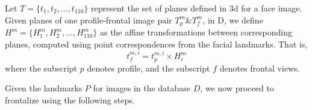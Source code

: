 Let $T = \{t_{1}, t_{2}, \ldots , t_{110}\}$
represent the set of planes defined in {\sc 3d} for a face image. Given planes of one
profile-frontal image pair $T_p^m \& T_f^m$, in D, we define $H^{m} = \{H_1^m, H_2^m, \ldots ,
H_{110}^m\}$ as the affine transformations between corresponding planes, computed using point correspondences from the facial landmarks. That is, 
\begin{equation}
  t_{f}^{m,i} = t_{p}^{m,i} \times H_i^m \label{eq:affine_transfomraiton}
\end{equation} 
where the subscript $p$ denotes profile, and the subscript $f$ denotes frontal views.

Given the landmarks $P$ for images in the database $D$, we now
proceed to frontalize using the following steps.
